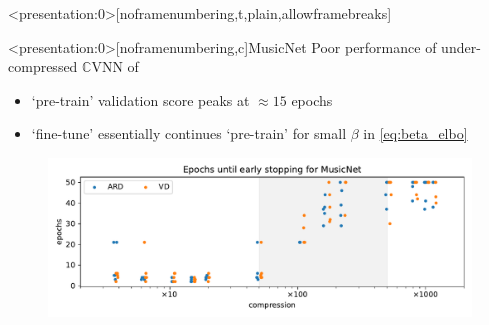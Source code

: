 \documentclass{beamer}
\newcommand{\cplx}{\mathbb{C}}
\begin{document}
\begin{frame}<presentation:0>[noframenumbering,t,plain,allowframebreaks]{\insertsection}
  \tiny
  
  
\end{frame}


\appendix
\begin{frame}<presentation:0>[noframenumbering,c]{MusicNet}{\insertsection}
  Poor performance of under-compressed $\cplx$VNN of \citet{trabelsi_deep_2018}
  \begin{itemize}
    \item `pre-train' validation score peaks at $\approx 15$ epochs
    \item `fine-tune' essentially continues `pre-train' for small $\beta$ in \eqref{eq:beta_elbo}
  \end{itemize}

  \begin{figure}[t]
    \centering
    \includegraphics[width=\linewidth]{figure__fine-tune_fx__early__compression.pdf}
  \end{figure}
\end{frame}
\end{document}
